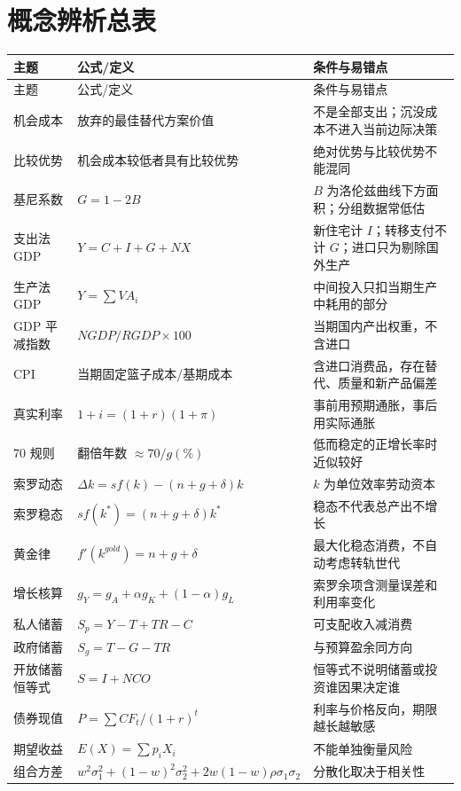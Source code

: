 \documentclass[UTF8,11pt,a4paper]{ctexart}
\begin{document}
\newpage
\section{概念辨析总表}

\begin{longtable}{p{}p{}p{}}
\toprule
主题 & 公式/定义 & 条件与易错点\\
\midrule
\endfirsthead
\toprule
主题 & 公式/定义 & 条件与易错点\\
\midrule
\endhead
机会成本 & 放弃的最佳替代方案价值 & 不是全部支出；沉没成本不进入当前边际决策\\
比较优势 & 机会成本较低者具有比较优势 & 绝对优势与比较优势不能混同\\
基尼系数 & $G=1-2B$ & $B$ 为洛伦兹曲线下方面积；分组数据常低估\\
支出法 GDP & $Y=C+I+G+NX$ & 新住宅计 $I$；转移支付不计 $G$；进口只为剔除国外生产\\
生产法 GDP & $Y=\sum VA_i$ & 中间投入只扣当期生产中耗用的部分\\
GDP 平减指数 & $NGDP/RGDP\times100$ & 当期国内产出权重，不含进口\\
CPI & 当期固定篮子成本/基期成本 & 含进口消费品，存在替代、质量和新产品偏差\\
真实利率 & $1+i=(1+r)(1+\pi)$ & 事前用预期通胀，事后用实际通胀\\
70 规则 & 翻倍年数 $\approx70/g(\%)$ & 低而稳定的正增长率时近似较好\\
索罗动态 & $\Delta k=sf(k)-(n+g+\delta)k$ & $k$ 为单位效率劳动资本\\
索罗稳态 & $sf(k^*)=(n+g+\delta)k^*$ & 稳态不代表总产出不增长\\
黄金律 & $f'(k^{gold})=n+g+\delta$ & 最大化稳态消费，不自动考虑转轨世代\\
增长核算 & $g_Y=g_A+\alpha g_K+(1-\alpha)g_L$ & 索罗余项含测量误差和利用率变化\\
私人储蓄 & $S_p=Y-T+TR-C$ & 可支配收入减消费\\
政府储蓄 & $S_g=T-G-TR$ & 与预算盈余同方向\\
开放储蓄恒等式 & $S=I+NCO$ & 恒等式不说明储蓄或投资谁因果决定谁\\
债券现值 & $P=\sum CF_t/(1+r)^t$ & 利率与价格反向，期限越长越敏感\\
期望收益 & $E(X)=\sum p_iX_i$ & 不能单独衡量风险\\
组合方差 & $w^2\sigma_1^2+(1-w)^2\sigma_2^2+2w(1-w)\rho\sigma_1\sigma_2$ & 分散化取决于相关性\\

\end{longtable}
\end{document}
